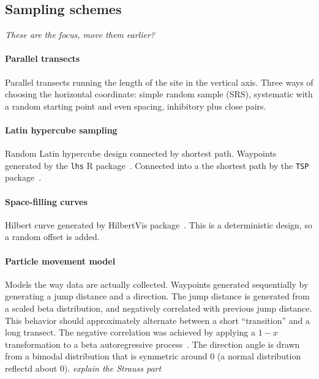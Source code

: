 \documentclass[review]{elsarticle}
\begin{document}



\subsection{Sampling schemes}

{\it These are the focus, move them earlier?}

\paragraph{Parallel transects} Parallel transects running the length of the
site in the vertical axis. Three ways of choosing the horizontal coordinate:
simple random sample (SRS), systematic with a random starting point and even
spacing, inhibitory plus close pairs.

\paragraph{Latin hypercube sampling}
Random Latin hypercube design connected by shortest path. Waypoints generated
by the \texttt{lhs} R package~\cite{lhs}. Connected into a the shortest path
by the \texttt{TSP} package~\citep{tsp}.

\paragraph{Space-filling curves}
Hilbert curve generated by HilbertVis package~\citep{hilbertvis}. This is a
deterministic design, so a random offset is added.

\paragraph{Particle movement model}
Models the way data are actually collected. Waypoints generated sequentially by
generating a jump distance and a direction. The jump distance is generated from
a scaled beta distribution, and negatively correlated with previous jump
distance. This behavior should approximately alternate between a short
``transition'' and a long transect. The negative correlation was achieved by
applying a \(1 - x\) transformation to a beta autoregressive
process~\citep{mckenzie}. The direction angle is drawn from a bimodal
distribution that is symmetric around 0 (a normal distribution reflectd about
0). {\it explain the Strauss part}
\end{document}
